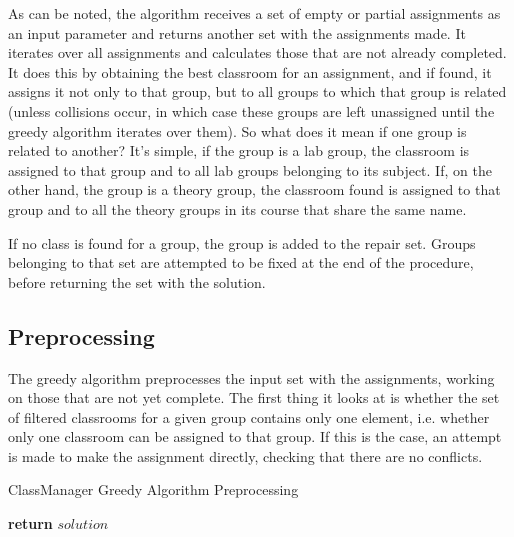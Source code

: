 As can be noted, the algorithm receives a set of empty or partial assignments as an input parameter and returns another set with the assignments made. It iterates over all assignments and calculates those that are not already completed. It does this by obtaining the best classroom for an assignment, and if found, it assigns it not only to that group, but to all groups to which that group is related (unless collisions occur, in which case these groups are left unassigned until the greedy algorithm iterates over them). So what does it mean if one group is related to another? It's simple, if the group is a lab group, the classroom is assigned to that group and to all lab groups belonging to its subject. If, on the other hand, the group is a theory group, the classroom found is assigned to that group and to all the theory groups in its course that share the same name.

If no class is found for a group, the group is added to the repair set. Groups belonging to that set are attempted to be fixed at the end of the procedure, before returning the set with the solution.


\subsection{Preprocessing}

The greedy algorithm preprocesses the input set with the assignments, working on those that are not yet complete. The first thing it looks at is whether the set of filtered classrooms for a given group contains only one element, i.e. whether only one classroom can be assigned to that group. If this is the case, an attempt is made to make the assignment directly, checking that there are no conflicts.

\begin{algorithm}[H]
    \caption{ClassManager Greedy Algorithm Preprocessing}
    \begin{algorithmic}[1]
                        \EndIf
                    \EndIf
                \EndIf
            \EndFor
            \State \textbf{return} $solution$
        \EndProcedure
    \end{algorithmic}
\end{algorithm}

